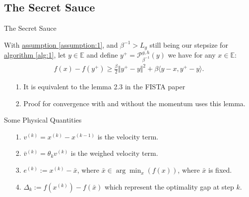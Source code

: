 \documentclass[11pt]{beamer}
\begin{document}
    \subsection{The Secret Sauce}
        \begin{frame}{The Secret Sauce}
            \begin{lemma}\label{lemma:prox_two_p}
                With \hyperref[assumption:1]{assumption \ref*{assumption:1}}, and $\beta^{-1} > L_g$ still being our stepsize for \hyperref[alg:1]{algorithm \ref*{alg:1}}, let $y\in \mathbb E$ and define $y^+ = \mathcal P_{\beta^{-1}}^{g, h}(y)$ we have for any $x\in \mathbb E$: 
                \begin{align*}
                    f(x) - f(y^+) \ge \frac{\beta}{2}\Vert y^+ - y\Vert^2 + 
                    \beta \langle y - x, y^+ - y\rangle. 
                \end{align*}
            \end{lemma}
            \begin{itemize}
                \item [1.] It is equivalent to the lemma 2.3 in the FISTA paper\cite{paper:FISTA}
                \pause \item [2.] Proof for convergence with and without the momentum uses this lemma. 
            \end{itemize}
        \end{frame}
        \begin{frame}{Some Physical Quantities}
            \begin{itemize}
                \item [1.] $v^{(k)} = x^{(k)} - x^{(k -1)}$ is the velocity term. 
                \pause\item [2.] $\bar v^{(k)}= \theta_k v^{(k)}$ is the weighed velocity term. 
                \pause\item [3.] $e^{(k)} := x^{(k)} - \bar x$, where $\bar x \in \arg\min_{x}(f(x))$, where $\bar x$ is fixed.
                \pause\item [4.] $\Delta_k := f(x^{(k)}) - f(\bar x)$ which represent the optimality gap at step $k$. 
            \end{itemize}
        \end{frame}
\end{document}
